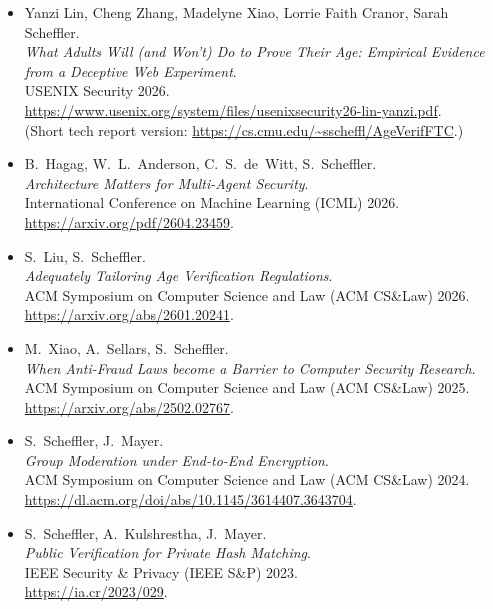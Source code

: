 \documentclass{res}
\begin{document}
\begin{resume}
\begin{itemize}
\item[\ageverifwebexperiment]Yanzi Lin, Cheng Zhang, Madelyne Xiao, Lorrie Faith Cranor, Sarah Scheffler. \\
\emph{What Adults Will (and Won't) Do to Prove Their Age: Empirical Evidence from a Deceptive Web Experiment}. \\
USENIX Security 2026. \\
\url{https://www.usenix.org/system/files/usenixsecurity26-lin-yanzi.pdf}. \\
(Short tech report version: \url{https://cs.cmu.edu/~sscheffl/AgeVerifFTC}.)

\item[\architecturematters]B.~Hagag, W.~L.~Anderson, C.~S.~de~Witt, S.~Scheffler. \\
\emph{Architecture Matters for Multi-Agent Security}. \\
International Conference on Machine Learning (ICML) 2026. \\
\url{https://arxiv.org/pdf/2604.23459}.

\item[\adequatetailoring] S.~Liu, S.~Scheffler. \\
\emph{Adequately Tailoring Age Verification Regulations}. \\
ACM Symposium on Computer Science and Law (ACM CS\&Law) 2026. \\
\url{https://arxiv.org/abs/2601.20241}.

\item[\fraudethics] M.~Xiao, A.~Sellars, S.~Scheffler. \\
\emph{When Anti-Fraud Laws become a Barrier to Computer Security Research}. \\
ACM Symposium on Computer Science and Law (ACM CS\&Law) 2025. \\
\url{https://arxiv.org/abs/2502.02767}.

\item[\eeegroup] S.~Scheffler, J.~Mayer. \\
\emph{Group Moderation under End-to-End Encryption}. \\
ACM Symposium on Computer Science and Law (ACM CS\&Law) 2024. \\
\url{https://dl.acm.org/doi/abs/10.1145/3614407.3643704}.

\item[\csamimprovements] S.~Scheffler, A.~Kulshrestha, J.~Mayer. \\
\emph{Public Verification for Private Hash Matching}. \\
IEEE Security \& Privacy (IEEE S\&P) 2023. \\
\url{https://ia.cr/2023/029}.


\end{itemize}
\end{resume}
\end{document}
